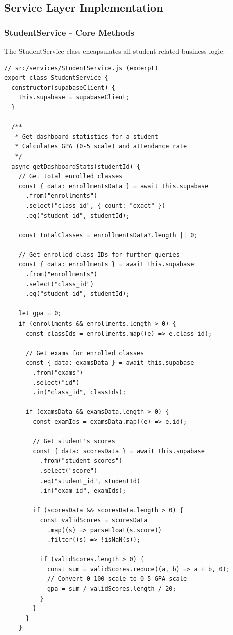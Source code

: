 \documentclass[12pt,a4paper]{article}
\begin{document}
\subsection{Service Layer Implementation}

\subsubsection{StudentService - Core Methods}

The StudentService class encapsulates all student-related business logic:

\begin{verbatim}
// src/services/StudentService.js (excerpt)
export class StudentService {
  constructor(supabaseClient) {
    this.supabase = supabaseClient;
  }

  /**
   * Get dashboard statistics for a student
   * Calculates GPA (0-5 scale) and attendance rate
   */
  async getDashboardStats(studentId) {
    // Get total enrolled classes
    const { data: enrollmentsData } = await this.supabase
      .from("enrollments")
      .select("class_id", { count: "exact" })
      .eq("student_id", studentId);

    const totalClasses = enrollmentsData?.length || 0;

    // Get enrolled class IDs for further queries
    const { data: enrollments } = await this.supabase
      .from("enrollments")
      .select("class_id")
      .eq("student_id", studentId);

    let gpa = 0;
    if (enrollments && enrollments.length > 0) {
      const classIds = enrollments.map((e) => e.class_id);

      // Get exams for enrolled classes
      const { data: examsData } = await this.supabase
        .from("exams")
        .select("id")
        .in("class_id", classIds);

      if (examsData && examsData.length > 0) {
        const examIds = examsData.map((e) => e.id);

        // Get student's scores
        const { data: scoresData } = await this.supabase
          .from("student_scores")
          .select("score")
          .eq("student_id", studentId)
          .in("exam_id", examIds);

        if (scoresData && scoresData.length > 0) {
          const validScores = scoresData
            .map((s) => parseFloat(s.score))
            .filter((s) => !isNaN(s));

          if (validScores.length > 0) {
            const sum = validScores.reduce((a, b) => a + b, 0);
            // Convert 0-100 scale to 0-5 GPA scale
            gpa = sum / validScores.length / 20;
          }
        }
      }
    }


\end{verbatim}
\end{document}
